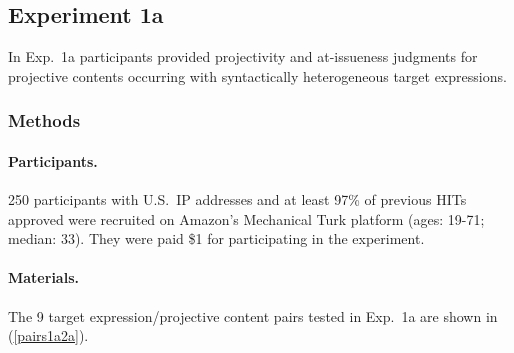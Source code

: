 \documentclass[11pt,fleqn]{article}
\newcommand{\6}{\mbox{$[\hspace*{-.6mm}[$}}
\newcommand{\9}{\mbox{$]\hspace*{-.6mm}]$}}
\begin{document}

\subsection{Experiment 1a}\label{s-exp1a}

In Exp.~1a participants provided projectivity and at-issueness judgments for projective contents occurring with syntactically heterogeneous target expressions. %

\subsubsection{Methods}\label{s-methods-1a}

\paragraph{Participants.} 250 participants with U.S.\ IP addresses and at least 97\% of previous HITs approved were recruited on Amazon's Mechanical Turk platform (ages: 19-71; median: 33). They were paid \$1 for participating in the experiment. 

\paragraph{Materials.} 

The 9 target expression/projective content pairs tested in Exp.~1a are shown in (\ref{pairs1a2a}).
\end{document}
